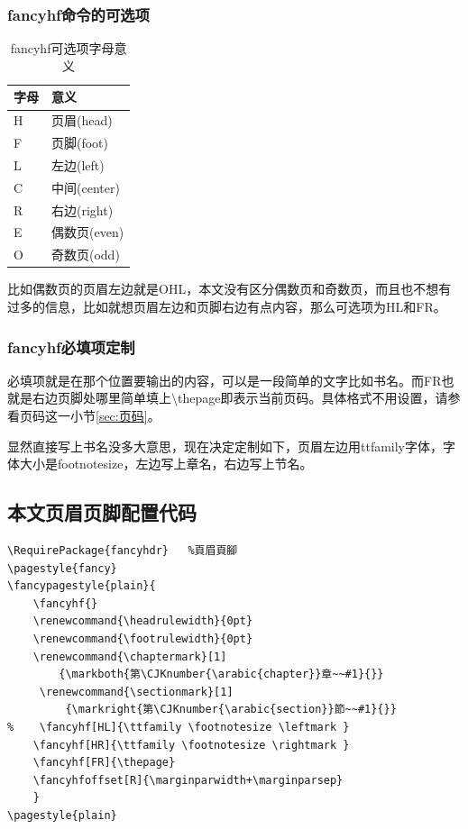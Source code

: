 \documentclass[11pt,oneside]{book}
\begin{document}
\begin{common-format}
\subsubsection{fancyhf命令的可选项}
\begin{table}[H]
\begin{tabular}{@{}ll@{}}
\toprule
字母 & 意义  \\ \midrule
H  & 页眉(head)  \\
F  & 页脚(foot)  \\
L  & 左边(left)  \\
C  & 中间(center)  \\
R  & 右边(right)  \\
E  & 偶数页(even) \\
O  & 奇数页(odd) \\ \bottomrule
\end{tabular}
\label{tab:fancyhf可选项字母意义}
\caption{fancyhf可选项字母意义}
\end{table}
比如偶数页的页眉左边就是OHL，本文没有区分偶数页和奇数页，而且也不想有过多的信息，比如就想页眉左边和页脚右边有点内容，那么可选项为HL和FR。

\subsubsection{fancyhf必填项定制}
必填项就是在那个位置要输出的内容，可以是一段简单的文字比如书名。而FR也就是右边页脚处哪里简单填上\textbackslash thepage即表示当前页码。具体格式不用设置，请参看页码这一小节\ref{sec:页码}。

显然直接写上书名没多大意思，现在决定定制如下，页眉左边用ttfamily字体，字体大小是footnotesize，左边写上章名，右边写上节名。

\subsection{本文页眉页脚配置代码}
\begin{Verbatim}
\RequirePackage{fancyhdr}   %頁眉頁腳
\pagestyle{fancy}
\fancypagestyle{plain}{
    \fancyhf{}
    \renewcommand{\headrulewidth}{0pt}
    \renewcommand{\footrulewidth}{0pt}
    \renewcommand{\chaptermark}[1]
        {\markboth{第\CJKnumber{\arabic{chapter}}章~~#1}{}} 
     \renewcommand{\sectionmark}[1]
         {\markright{第\CJKnumber{\arabic{section}}節~~#1}{}} 
%    \fancyhf[HL]{\ttfamily \footnotesize \leftmark }
    \fancyhf[HR]{\ttfamily \footnotesize \rightmark }
    \fancyhf[FR]{\thepage}
    \fancyhfoffset[R]{\marginparwidth+\marginparsep}
    }
\pagestyle{plain} 
\end{Verbatim}

\end{common-format}
\end{document}
